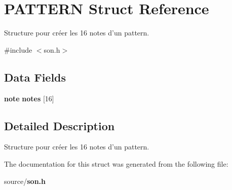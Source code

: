 \section{PATTERN Struct Reference}
\label{struct_p_a_t_t_e_r_n}


Structure pour créer les 16 notes d'un pattern.  




{\ttfamily \#include $<$son.h$>$}

\subsection*{Data Fields}
\begin{DoxyCompactItemize}
\item 
{\bf note} {\bfseries notes} [16]\label{struct_p_a_t_t_e_r_n_a9b0ff0740576eaa70a941be18d229140}

\end{DoxyCompactItemize}


\subsection{Detailed Description}
Structure pour créer les 16 notes d'un pattern. 

The documentation for this struct was generated from the following file:\begin{DoxyCompactItemize}
\item 
source/{\bf son.h}\end{DoxyCompactItemize}
